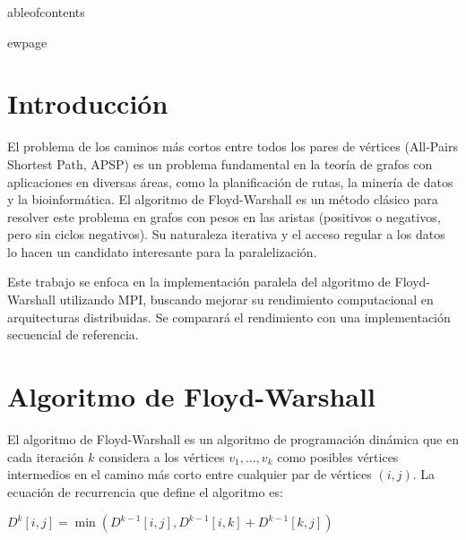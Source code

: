 \documentclass[12pt, a4paper]{article}
\author{Tu Nombre} %
\date{	oday}
\begin{document}
\maketitle

\begin{abstract}
Este documento presenta la implementación y el análisis de rendimiento del algoritmo de Floyd-Warshall para el cálculo de los caminos más cortos entre todos los pares de vértices en un grafo ponderado. Se detallan tanto una versión secuencial como una paralela, esta última utilizando el estándar MPI (Message Passing Interface) con una estrategia de descomposición de datos por bloques de filas. Se incluyen los resultados de un benchmark comparativo que evalúa el speedup y la eficiencia de la implementación paralela.
\end{abstract}

	ableofcontents


ewpage

\section{Introducción}
El problema de los caminos más cortos entre todos los pares de vértices (All-Pairs Shortest Path, APSP) es un problema fundamental en la teoría de grafos con aplicaciones en diversas áreas, como la planificación de rutas, la minería de datos y la bioinformática. El algoritmo de Floyd-Warshall es un método clásico para resolver este problema en grafos con pesos en las aristas (positivos o negativos, pero sin ciclos negativos). Su naturaleza iterativa y el acceso regular a los datos lo hacen un candidato interesante para la paralelización.

Este trabajo se enfoca en la implementación paralela del algoritmo de Floyd-Warshall utilizando MPI, buscando mejorar su rendimiento computacional en arquitecturas distribuidas. Se comparará el rendimiento con una implementación secuencial de referencia.

\section{Algoritmo de Floyd-Warshall}
El algoritmo de Floyd-Warshall es un algoritmo de programación dinámica que en cada iteración $k$ considera a los vértices $v_1, \dots, v_k$ como posibles vértices intermedios en el camino más corto entre cualquier par de vértices $(i, j)$. La ecuación de recurrencia que define el algoritmo es:

$D^{k}[i, j] = \min(D^{k-1}[i, j], D^{k-1}[i, k] + D^{k-1}[k, j])$
\end{document}
